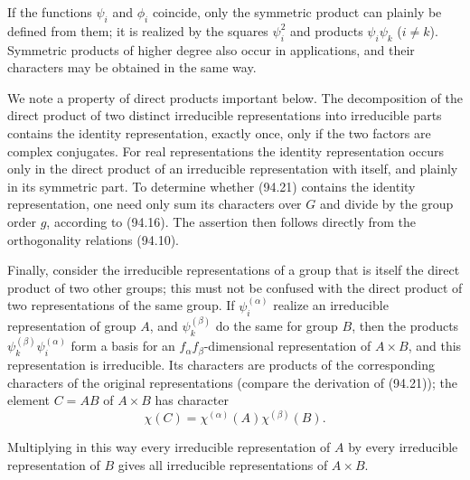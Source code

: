 If the functions $\psi_i$ and $\phi_i$ coincide, only the symmetric product can plainly be defined from them; it is realized by the squares $\psi_i^2$ and products $\psi_i\psi_k$ ($i\ne k$). Symmetric products of higher degree also occur in applications, and their characters may be obtained in the same way.

We note a property of direct products important below. The decomposition of the direct product of two distinct irreducible representations into irreducible parts contains the identity representation, exactly once, only if the two factors are complex conjugates. For real representations the identity representation occurs only in the direct product of an irreducible representation with itself, and plainly in its symmetric part. To determine whether (94.21) contains the identity representation, one need only sum its characters over $G$ and divide by the group order $g$, according to (94.16). The assertion then follows directly from the orthogonality relations (94.10).

Finally, consider the irreducible representations of a group that is itself the direct product of two other groups; this must not be confused with the direct product of two representations of the same group. If $\psi_i^{(\alpha)}$ realize an irreducible representation of group $A$, and $\psi_k^{(\beta)}$ do the same for group $B$, then the products $\psi_k^{(\beta)}\psi_i^{(\alpha)}$ form a basis for an $f_\alpha f_\beta$-dimensional representation of $A\times B$, and this representation is irreducible. Its characters are products of the corresponding characters of the original representations (compare the derivation of (94.21)); the element $C=AB$ of $A\times B$ has character
\begin{equation}
 \chi(C)=\chi^{(\alpha)}(A)\chi^{(\beta)}(B).
 \tag{94.24}
\end{equation}

Multiplying in this way every irreducible representation of $A$ by every irreducible representation of $B$ gives all irreducible representations of $A\times B$.
